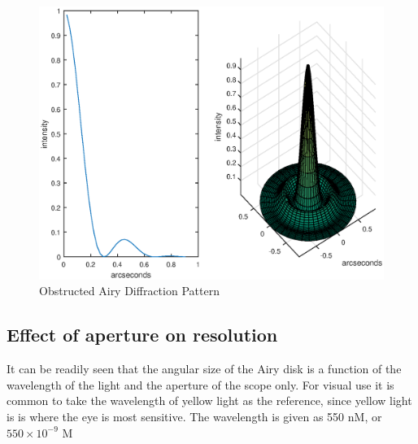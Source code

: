 \documentclass[11pt]{article}
\begin{document}
\begin{figure}[htb]
	\begin{center}
		\includegraphics[scale=0.7]{./images/obstructed-airy.eps}
		\caption{Obstructed Airy Diffraction Pattern}
		\label{fig:obstructed-airy}
	\end{center}
\end{figure}



\subsection{Effect of aperture on resolution}

It can be readily seen that the angular size of the Airy disk is a function of the wavelength of the light and the aperture of the scope only.  For visual use it is common to take the wavelength of yellow light as the reference, since yellow light is is where the eye is most sensitive.  The wavelength is given as 550 nM, or $550\times 10^{-9}$ M 

\newpage 
\end{document}
